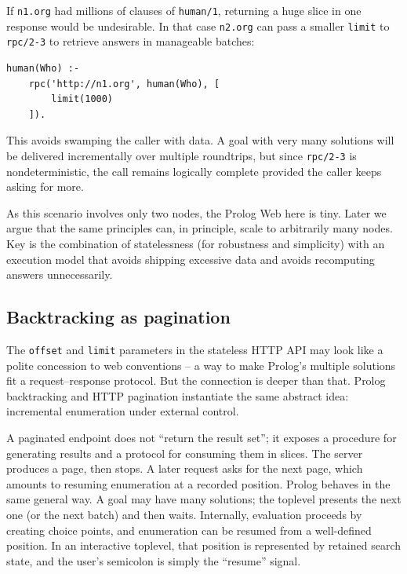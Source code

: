 If \texttt{n1.org} had millions of clauses of \texttt{human/1},
returning a huge slice in one response would be undesirable. In that
case \texttt{n2.org} can pass a smaller \texttt{limit} to
\texttt{rpc/2-3} to retrieve answers in manageable batches:

\begin{verbatim}
human(Who) :-
    rpc('http://n1.org', human(Who), [
        limit(1000)
    ]).
\end{verbatim}

\noindent This avoids swamping the caller with data. A goal with
very many solutions will be delivered incrementally over multiple
roundtrips, but since \texttt{rpc/2-3} is nondeterministic, the call
remains logically complete provided the caller keeps asking for more.


\medskip
\noindent As this scenario involves only two nodes, the Prolog Web here is tiny. Later we argue that the same principles can, in principle, scale to arbitrarily many nodes. Key is the combination of statelessness (for robustness and simplicity) with an execution model that avoids shipping excessive data and avoids recomputing answers unnecessarily.


\subsection{Backtracking as pagination}
\label{sec:backtracking-as-pagination}

The \texttt{offset} and \texttt{limit} parameters in the stateless
HTTP API may look like a polite concession to web conventions -- a
way to make Prolog's multiple solutions fit a request--response
protocol. But the connection is deeper than that. Prolog
backtracking and HTTP pagination instantiate the same abstract idea:
incremental enumeration under external control.

A paginated endpoint does not ``return the result set''; it exposes
a procedure for generating results and a protocol for consuming them
in slices. The server produces a page, then stops. A later request
asks for the next page, which amounts to resuming enumeration at a
recorded position. Prolog behaves in the same general way. A goal
may have many solutions; the toplevel presents the next one (or the
next batch) and then waits. Internally, evaluation proceeds by
creating choice points, and enumeration can be resumed from a
well-defined position. In an interactive toplevel, that position is
represented by retained search state, and the user's semicolon is
simply the ``resume'' signal.


